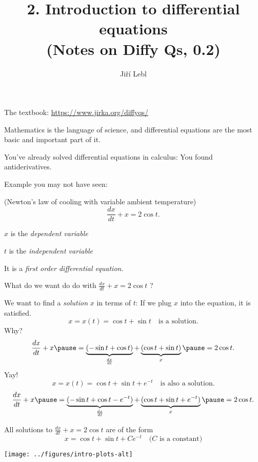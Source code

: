 \documentclass[10pt,aspectratio=169]{beamer}
\author{Ji\v{r}\'i Lebl}
\institute[OSU]{%
Oklahoma State University%
}
\title{2. Introduction to differential equations\\(Notes on Diffy Qs, 0.2)}
\date{}
\begin{document}
\begin{frame}
\titlepage


\begin{center}
The textbook: \url{https://www.jirka.org/diffyqs/}
\end{center}
\end{frame}

\begin{frame}
Mathematics is the language of science, and differential equations
are the most basic and important part of it.

\medskip
\pause

You've already solved differential equations in calculus: You found
antiderivatives.

\medskip
\pause

Example you may not have seen:

{\small (Newton's law of cooling with variable ambient temperature)}
\[
\frac{dx}{dt} + x = 2 \cos t .
\]

\pause
$x$ is the \emph{dependent variable}

$t$ is the \emph{independent variable}

\medskip
\pause

It is a
\emph{first order differential equation}.

\end{frame}

\begin{frame}
What do we want do do with
\quad
$\displaystyle
\frac{dx}{dt} + x = 2 \cos t$ \quad ?

\medskip
\pause
We want to find a \emph{solution} $x$ in terms of $t$:
\quad
\pause
If we plug $x$ into the equation, it is satisfied.
\pause
\[
x = x(t) = \cos t + \sin t
\quad \text{is a solution.}
\]
\pause
Why?
\pause
\[
\frac{dx}{dt} + x
\pause
= 
\underbrace{(-\sin t + \cos t)}_{\frac{dx}{dt}}
+
\underbrace{(\cos t + \sin t)}_{x}
\pause
=
2\cos t .
\]
\pause
Yay!
\pause
\[
x = x(t) = \cos t + \sin t + e^{-t}
\quad \text{is also a solution.}
\]
\pause
\[
\frac{dx}{dt} + x
\pause
= 
\underbrace{(-\sin t + \cos t - e^{-t})}_{\frac{dx}{dt}} +
\underbrace{(\cos t + \sin t + e^{-t})}_{x}
\pause
= 2\cos t .
\]
\end{frame}

\begin{frame}
All solutions to 
\quad
$\displaystyle
\frac{dx}{dt} + x = 2 \cos t$ \quad are of the form
\[
x = \cos t + \sin t + C e^{-t}  \quad \text{($C$ is a constant)}
\]
\pause
\begin{center}
\texttt{[image: ../figures/intro-plots-alt]}
\end{center}

\end{frame}
\end{document}

